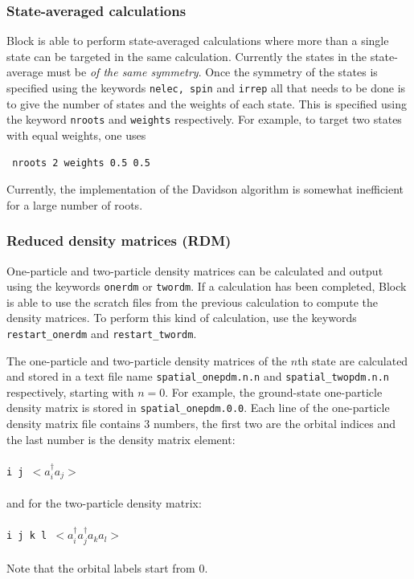 \documentclass[letterpaper,12pt,aps, pra]{revtex4-1}
\begin{document}
\subsubsection{State-averaged calculations}
Block is able to perform state-averaged calculations where more than a single
state can be targeted in the same calculation. Currently the states in the
state-average must be \emph{of the same symmetry}. Once the symmetry of the
states is specified using the keywords \texttt{nelec, spin} and \texttt{irrep}
all that needs to be done is to give the number of states and the weights of
each state. This is specified using the keyword \texttt{nroots} and
\texttt{weights} respectively. For example, to target two states with equal
weights, one uses \begin{verbatim} nroots 2 weights 0.5 0.5 \end{verbatim}
Currently, the implementation of the Davidson algorithm is somewhat inefficient
for a large number of roots.

\subsubsection{Reduced density matrices (RDM)}
One-particle and two-particle density matrices can be calculated and output
using the keywords \texttt{onerdm} or \texttt{twordm}.  If a calculation has
been completed, Block is able to use the scratch files from the previous
calculation to compute the density matrices. To perform this kind of
calculation,  use the keywords \texttt{restart\_onerdm} and
\texttt{restart\_twordm}.

The one-particle and two-particle density matrices of the $n$th state are
calculated and stored in a text file name \texttt{spatial\_onepdm.n.n} and
\texttt{spatial\_twopdm.n.n} respectively, starting with $n=0$. For example,
the ground-state one-particle density matrix is stored in
\texttt{spatial\_onepdm.0.0}.  Each line of the one-particle density matrix
file contains 3 numbers, the first two are the orbital indices and the last
number is the density matrix element:
\\ \texttt{ \\i j $<a_i^\dag a_j>$\\ }
\\and for the two-particle density matrix:
\\ \texttt{ \\i j k l $<a_i^\dag
a_j^\dag a_k a_l>$\\ } 
\\Note that the orbital labels start from 0.
\end{document}
